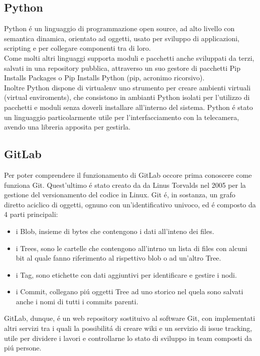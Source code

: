 \subsection{Python}
Python \'e un linguaggio di programmazione open source, ad alto livello con semantica dinamica, orientato ad oggetti, usato
per sviluppo di applicazioni, scripting e per collegare componenti tra di loro.\\[1\baselineskip]
Come molti altri linguaggi supporta moduli e pacchetti anche sviluppati da terzi, salvati in una repository pubblica,
attraverso un suo gestore di pacchetti Pip Installs Packages o Pip Installs Python (pip, acronimo ricorsivo).
\\[1\baselineskip]
Inoltre Python dispone di virtualenv uno strumento per creare ambienti virtuali (virtual enviroments), che consistono in ambianti Python
isolati per l'utilizzo di pacchetti e moduli senza doverli installare all'interno del sistema.
Python \'e stato un linguaggio particolarmente utile per l'interfacciamento con la telecamera, avendo una libreria
apposita per gestirla.
\\[2\baselineskip]

\subsection{GitLab}
Per poter comprendere il funzionamento di GitLab occore prima conoscere come funziona Git. Quest'ultimo \'e stato
creato da da Linus Torvalds nel 2005 per la gestione del versionamento del codice in Linux.
Git \'e, in sostanza, un grafo diretto aciclico di oggetti, ognuno con un'identificativo univoco, ed \'e composto da 4 parti principali:
\begin{itemize}
\item i Blob, insieme di bytes che contengono i dati all'inteno dei files.
\item i Trees, sono le cartelle che contengono all'intrno un lista di files con alcuni bit al quale fanno riferimento al
rispettivo blob o ad un'altro Tree.
\item i Tag, sono etichette con dati aggiuntivi per identificare e gestire i nodi.
\item i Commit, collegano pi\'u oggetti Tree ad uno storico nel quela sono salvati anche i nomi di tutti i commits parenti.
\end{itemize}
GitLab, dunque, \'e un web repository sostituivo al software Git, con implementati altri
servizi tra i quali la possibilit\'a di creare wiki e un servizio di issue tracking, utile
per dividere i lavori e controllarne lo stato di sviluppo in team composti da pi\'u persone.
